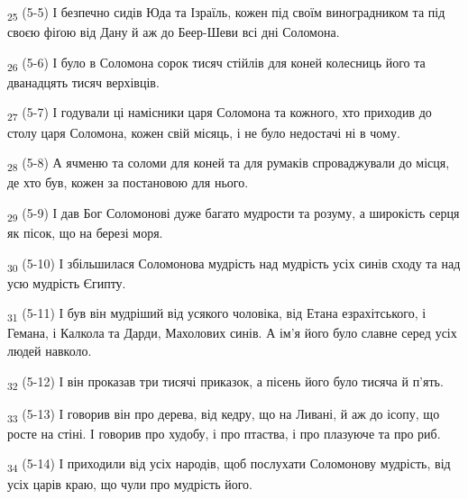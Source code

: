 \begin{tcolorbox}
\textsubscript{25} (5-5) І безпечно сидів Юда та Ізраїль, кожен під своїм виноградником та під своєю фіґою від Дану й аж до Беер-Шеви всі дні Соломона.
\end{tcolorbox}
\begin{tcolorbox}
\textsubscript{26} (5-6) І було в Соломона сорок тисяч стійлів для коней колесниць його та дванадцять тисяч верхівців.
\end{tcolorbox}
\begin{tcolorbox}
\textsubscript{27} (5-7) І годували ці намісники царя Соломона та кожного, хто приходив до столу царя Соломона, кожен свій місяць, і не було недостачі ні в чому.
\end{tcolorbox}
\begin{tcolorbox}
\textsubscript{28} (5-8) А ячменю та соломи для коней та для румаків спроваджували до місця, де хто був, кожен за постановою для нього.
\end{tcolorbox}
\begin{tcolorbox}
\textsubscript{29} (5-9) І дав Бог Соломонові дуже багато мудрости та розуму, а широкість серця як пісок, що на березі моря.
\end{tcolorbox}
\begin{tcolorbox}
\textsubscript{30} (5-10) І збільшилася Соломонова мудрість над мудрість усіх синів сходу та над усю мудрість Єгипту.
\end{tcolorbox}
\begin{tcolorbox}
\textsubscript{31} (5-11) І був він мудріший від усякого чоловіка, від Етана езрахітського, і Гемана, і Калкола та Дарди, Махолових синів. А ім'я його було славне серед усіх людей навколо.
\end{tcolorbox}
\begin{tcolorbox}
\textsubscript{32} (5-12) І він проказав три тисячі приказок, а пісень його було тисяча й п'ять.
\end{tcolorbox}
\begin{tcolorbox}
\textsubscript{33} (5-13) І говорив він про дерева, від кедру, що на Ливані, й аж до ісопу, що росте на стіні. І говорив про худобу, і про птаства, і про плазуюче та про риб.
\end{tcolorbox}
\begin{tcolorbox}
\textsubscript{34} (5-14) І приходили від усіх народів, щоб послухати Соломонову мудрість, від усіх царів краю, що чули про мудрість його.
\end{tcolorbox}
